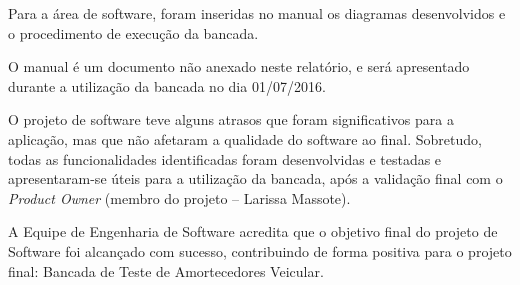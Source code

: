 		Para a área de software, foram inseridas no manual os diagramas desenvolvidos e o procedimento de execução da bancada.
		
		O manual é um documento não anexado neste relatório, e será apresentado durante a utilização da bancada no dia 01/07/2016.


		O projeto de software teve alguns atrasos que foram significativos para a aplicação, mas que não afetaram a qualidade do software ao final. Sobretudo, todas as funcionalidades identificadas foram desenvolvidas e testadas e apresentaram-se úteis para a utilização da bancada, após a validação final com o \textit{Product Owner} (membro do projeto – Larissa Massote).
		
		A Equipe de Engenharia de Software acredita que o objetivo final do projeto de Software foi alcançado com sucesso, contribuindo de forma positiva para o projeto final: Bancada de Teste de Amortecedores Veicular. 